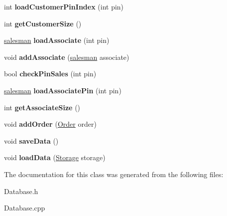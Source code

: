 \begin{DoxyCompactItemize}
\item 
int {\bfseries load\+Customer\+Pin\+Index} (int pin)\hypertarget{classDatabase_a073263cf7a55f9969f71d8f121d1dd15}{}\label{classDatabase_a073263cf7a55f9969f71d8f121d1dd15}

\item 
int {\bfseries get\+Customer\+Size} ()\hypertarget{classDatabase_a42fdd4aec54f0345304a6eb97f3ea887}{}\label{classDatabase_a42fdd4aec54f0345304a6eb97f3ea887}

\item 
\hyperlink{classsalesman}{salesman} {\bfseries load\+Associate} (int pin)\hypertarget{classDatabase_aa2660743a0ee693379942ef661f360fc}{}\label{classDatabase_aa2660743a0ee693379942ef661f360fc}

\item 
void {\bfseries add\+Associate} (\hyperlink{classsalesman}{salesman} associate)\hypertarget{classDatabase_ab2ba6332007153ad13773f059c544ef5}{}\label{classDatabase_ab2ba6332007153ad13773f059c544ef5}

\item 
bool {\bfseries check\+Pin\+Sales} (int pin)\hypertarget{classDatabase_ae116cdba8bec299d5c8a39214355657c}{}\label{classDatabase_ae116cdba8bec299d5c8a39214355657c}

\item 
\hyperlink{classsalesman}{salesman} {\bfseries load\+Associate\+Pin} (int pin)\hypertarget{classDatabase_a38f1909c6dbe12601b0f4fe985887573}{}\label{classDatabase_a38f1909c6dbe12601b0f4fe985887573}

\item 
int {\bfseries get\+Associate\+Size} ()\hypertarget{classDatabase_a290ce3262824a9c8d6ea78326a7172e7}{}\label{classDatabase_a290ce3262824a9c8d6ea78326a7172e7}

\item 
void {\bfseries add\+Order} (\hyperlink{classOrder}{Order} order)\hypertarget{classDatabase_ad5a3b7a09c8ba009dc46c4d8a3e54954}{}\label{classDatabase_ad5a3b7a09c8ba009dc46c4d8a3e54954}

\item 
void {\bfseries save\+Data} ()\hypertarget{classDatabase_a4bfbcd31b36245c9a26b72df1d981e47}{}\label{classDatabase_a4bfbcd31b36245c9a26b72df1d981e47}

\item 
void {\bfseries load\+Data} (\hyperlink{classStorage}{Storage} storage)\hypertarget{classDatabase_a292b82b6274b9b1e50154e76d3d67174}{}\label{classDatabase_a292b82b6274b9b1e50154e76d3d67174}

\end{DoxyCompactItemize}


The documentation for this class was generated from the following files\+:\begin{DoxyCompactItemize}
\item 
Database.\+h\item 
Database.\+cpp\end{DoxyCompactItemize}
